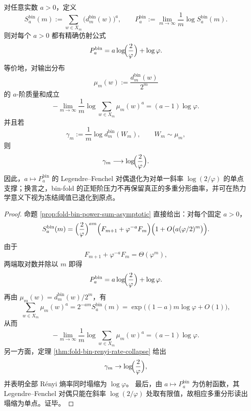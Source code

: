 \begin{theorem}\label{thm:gut-binfold-affine-pressure-single-slope}
对任意实数 \(a>0\)，定义
\[
S_a^{\mathrm{bin}}(m):=\sum_{w\in X_m}\bigl(d_m^{\mathrm{bin}}(w)\bigr)^a,
\qquad
P_a^{\mathrm{bin}}:=\lim_{m\to\infty}\frac{1}{m}\log S_a^{\mathrm{bin}}(m).
\]
则对每个 \(a>0\) 都有精确仿射公式
\[
P_a^{\mathrm{bin}}=a\log\!\Bigl(\frac{2}{\varphi}\Bigr)+\log\varphi.
\]
等价地，对输出分布
\[
\mu_m(w):=\frac{d_m^{\mathrm{bin}}(w)}{2^m}
\]
的 \(a\)-阶质量和成立
\[
-\lim_{m\to\infty}\frac{1}{m}\log\sum_{w\in X_m}\mu_m(w)^a
=(a-1)\log\varphi.
\]
并且若
\[
\gamma_m:=\frac{1}{m}\log d_m^{\mathrm{bin}}(W_m),
\qquad W_m\sim \mu_m,
\]
则
\[
\gamma_m\longrightarrow \log\!\Bigl(\frac{2}{\varphi}\Bigr).
\]
因此，\(a\mapsto P_a^{\mathrm{bin}}\) 的 Legendre--Fenchel 对偶退化为对单一斜率 \(\log(2/\varphi)\) 的单点支撑；换言之，bin-fold 的正矩阶压力不再保留真正的多重分形曲率，并可在热力学意义下视为冻结阈值已退化到原点。
\end{theorem}
\begin{proof}
命题 \ref{prop:fold-bin-power-sum-asymptotic} 直接给出：对每个固定 \(a>0\)，
\[
S_a^{\mathrm{bin}}(m)
=
\Bigl(\frac{2}{\varphi}\Bigr)^{am}
\Bigl(F_{m+1}+\varphi^{-a}F_m\Bigr)
\Bigl(1+O\bigl(a(\varphi/2)^m\bigr)\Bigr).
\]
由于
\[
F_{m+1}+\varphi^{-a}F_m=\Theta(\varphi^m),
\]
两端取对数并除以 \(m\) 即得
\[
P_a^{\mathrm{bin}}=a\log\!\Bigl(\frac{2}{\varphi}\Bigr)+\log\varphi.
\]
再由 \(\mu_m(w)=d_m^{\mathrm{bin}}(w)/2^m\)，有
\[
\sum_{w\in X_m}\mu_m(w)^a
=
2^{-am}S_a^{\mathrm{bin}}(m)
=
\exp\!\bigl((1-a)m\log\varphi+O(1)\bigr),
\]
从而
\[
-\lim_{m\to\infty}\frac{1}{m}\log\sum_{w\in X_m}\mu_m(w)^a
=(a-1)\log\varphi.
\]
另一方面，定理 \ref{thm:fold-bin-renyi-rate-collapse} 给出
\[
\gamma_m\to\log\!\Bigl(\frac{2}{\varphi}\Bigr),
\]
并表明全部 Rényi 熵率同时塌缩为 \(\log\varphi\)。
最后，由 \(a\mapsto P_a^{\mathrm{bin}}\) 为仿射函数，其 Legendre--Fenchel 对偶只能在斜率 \(\log(2/\varphi)\) 处取有限值，故相应多重分形读出塌缩为单点。证毕。
\end{proof}

